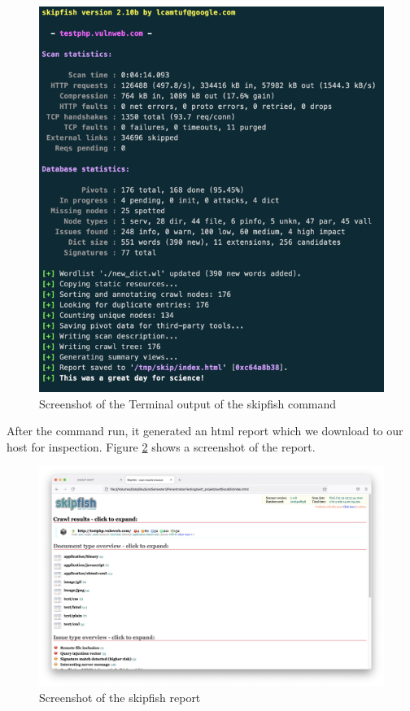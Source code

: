 \begin{figure}[H]
	\centering
	\includegraphics[width=12cm,keepaspectratio=true]{pictures/terminal1.png}
	\caption{
		Screenshot of the Terminal output of the skipfish command
	}
	\label{fig:terminal1}
\end{figure}

After the command run, it generated an html report which we download to our host for inspection. Figure \ref{fig:ui4} shows a screenshot of the report.

\begin{figure}[H]
	\centering
	\includegraphics[width=12cm,keepaspectratio=true]{pictures/ui4.png}
	\caption{
		Screenshot of the skipfish report
	}
	\label{fig:ui4}
\end{figure}

